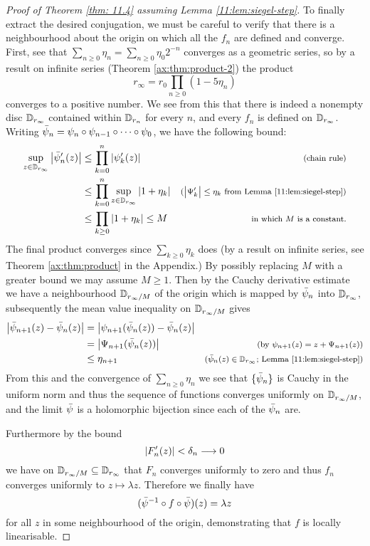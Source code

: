 \documentclass[../main.tex]{subfiles}
\begin{document}
\begin{proof}[Proof of Theorem \ref{thm: 11.4} assuming Lemma \ref{11:lem:siegel-step}]
To finally extract the desired conjugation, we must be careful to verify that there is a neighbourhood about the origin on which all the $f_n$ are defined and converge. First, see that $\sum_{n\ge0} \eta_n = \sum_{n\ge0} \eta_0 2^{-n}$ converges as a geometric series, so by a result on infinite series (Theorem \ref{ax:thm:product-2}) the product
\[
r_\infty = r_0 \prod_{n\ge0} (1 - 5\eta_n)
\]
converges to a positive number. We see from this that there is indeed a nonempty disc $\mathbb{D}_{r_\infty}$ contained within $\mathbb{D}_{r_n}$ for every $n$, and every $f_n$ is defined on $\mathbb{D}_{r_\infty}$. Writing $\bar{\psi}_n = \psi_n \circ \psi_{n-1} \circ \cdots \circ \psi_0$, we have the following bound:
\begin{align*}
    \sup_{z \in \mathbb{D}_{r_\infty}} \left|\bar{\psi}_n'(z)\right|
    &\le
    \prod\limits_{k=0}^n \left|\psi_k'(z)\right|
    &\text{\footnotesize{(chain rule)}}\\
    &\le
    \prod\limits_{k=0}^n \sup_{z \in \mathbb{D}_{r_\infty}} \left|1 + \eta_k\right|
    &\text{\footnotesize{($\left|\Psi_k'\right| \le \eta_k$ from Lemma \ref{11:lem:siegel-step})}}\\
    &\le
    \prod\limits_{k\ge0} \left|1 + \eta_k\right| \le M &\text{\footnotesize in which $M$ is a constant.}
\end{align*}
The final product converges since $\sum_{k\ge0} \eta_k$ does (by a result on infinite series, see Theorem \ref{ax:thm:product} in the Appendix.) %
By possibly replacing $M$ with a greater bound we may assume $M \ge 1$. Then by the Cauchy derivative estimate we have a neighbourhood $\mathbb{D}_{r_\infty/M}$ of the origin which is mapped by $\bar{\psi}_n$ into $\mathbb{D}_{r_\infty}$, subsequently the mean value inequality on $\mathbb{D}_{r_\infty/M}$ gives
%
\begin{align*}
\left|\bar{\psi}_{n+1}(z) - \bar{\psi}_n(z)\right|
&=
\left|\psi_{n+1}(\bar{\psi}_n(z)) - \bar{\psi}_n(z)\right|\\
&=
\left|\Psi_{n+1}(\bar{\psi}_n(z))\right| &\text{\footnotesize{(by $\psi_{n+1}(z) = z + \Psi_{n+1}(z)$)}}\\
&\le \eta_{n+1} 
&\text{\footnotesize{($\bar{\psi}_n(z) \in \mathbb{D}_{r_\infty}$; Lemma \ref{11:lem:siegel-step})}}\\
\end{align*}
%
From this and the convergence of $\sum_{n\ge0} \eta_n$ we see that $\{\bar{\psi}_n\}$ is Cauchy in the uniform norm and thus the sequence of functions converges uniformly on $\mathbb{D}_{r_\infty/M}$, and the limit $\bar{\psi}$ is a holomorphic bijection since each of the $\bar{\psi}_n$ are.

Furthermore by the bound
\[
\left|F_{n}'(z)\right| < \delta_{n} \longrightarrow 0
\]
we have on $\mathbb{D}_{r_\infty/M} \subseteq \mathbb{D}_{r_\infty}$ that $F_n$ converges uniformly to zero and thus $f_n$ converges uniformly to $z \mapsto \lambda z$. Therefore we finally have
\[
(\bar{\psi}^{-1} \circ f \circ \bar{\psi})(z) = \lambda z
\]
for all $z$ in some neighbourhood of the origin, demonstrating that $f$ is locally linearisable.
\end{proof}
\end{document}
